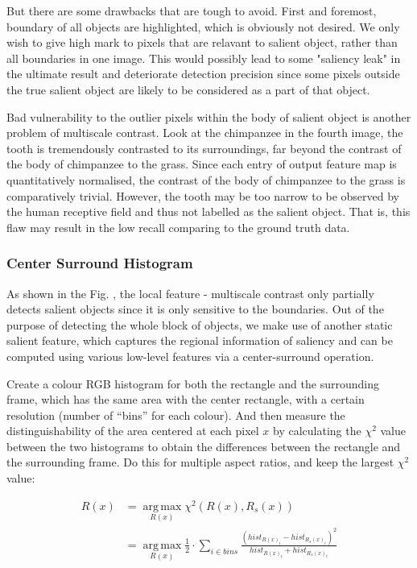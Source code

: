 \documentclass[10pt,twocolumn,letterpaper]{article}
\DeclareMathOperator*{\argmax}{arg\,max}
\newcommand{\SUM}{\sum\limits}
\begin{document}
But there are some drawbacks that are tough to avoid. 
First and foremost, boundary of all objects are highlighted, which is obviously not desired.
We only wish to give high mark to pixels that are relavant to salient object, rather than all boundaries in one image. 
This would possibly lead to some "saliency leak" in the ultimate result and deteriorate detection precision
 since some pixels outside the true salient object are likely to be considered as a part of that object.

Bad vulnerability to the outlier pixels within the body of salient object is another problem of multiscale contrast. 
Look at the chimpanzee in the fourth image, the tooth is tremendously contrasted to its surroundings,
far beyond the contrast of the body of chimpanzee to the grass. Since each entry of output feature map 
is quantitatively normalised, the contrast of the body of chimpanzee to the grass is comparatively trivial.
However, the tooth may be too narrow to be observed by the human receptive field and thus not 
labelled as the salient object. That is, this flaw may result in the low recall comparing to the ground truth data.%

\subsubsection{Center Surround Histogram}
    As shown in the Fig. , the local feature - multiscale contrast only partially detects salient objects 
since it is only sensitive to the boundaries. Out of the purpose of detecting the whole block of objects,
we make use of another static salient feature, which captures the regional information of saliency  
and can be computed using various low-level features via a center-surround operation. 

Create a colour RGB histogram for both the rectangle and the surrounding frame, 
which has the same area with the center rectangle, with a certain resolution 
(number of ``bins'' for each colour). And then measure the distinguishability of the 
area centered at each pixel $x$ 
by calculating the $\chi^2$ value between the two histograms to obtain the differences 
between the rectangle and the surrounding frame.  Do this for multiple aspect ratios, 
and keep the largest $\chi^2$ value: 

    \begin{align*}
    R(x) &= \argmax\limits_{R(x)}\chi^2(R(x), R_s(x)) \\ &=\argmax\limits_{R(x)}\frac{1}{2}\cdot\SUM_{i\in bins}\frac{(hist_{R(x)_i}-hist_{R_s(x)_i})^2}{hist_{R(x)_i}+hist_{R_s(x)_i}}
    \end{align*}
    
\end{document}
